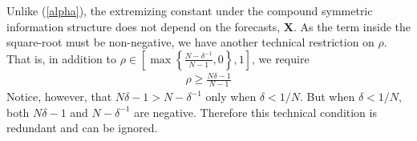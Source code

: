 \documentclass[11pt,twoside]{article}
\begin{document}
Unlike (\ref{alpha}), the extremizing constant under the compound symmetric information structure does not depend on the forecasts, $\boldsymbol{X}$. As the term inside the square-root must be non-negative, we have another technical restriction on $\rho$. That is, in addition to $\rho \in \left[  \max \left\{ \frac{N-\delta^{-1}}{N-1}, 0\right\}, 1 \right]$, we require
\begin{align*}
\rho \geq \frac{N\delta - 1}{N-1}
\end{align*}
Notice, however, that $N\delta - 1 > N - \delta^{-1}$ only when $\delta < 1/N$. But when $\delta < 1/N$, both $N\delta - 1$ and $N - \delta^{-1}$ are negative. Therefore this technical condition is redundant and can be ignored. 





%
%
%
%
%
%
\end{document}
